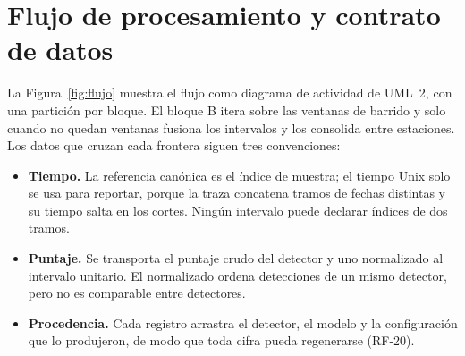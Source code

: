 \documentclass[12pt,oneside,spanish,oldfontcommands]{memoir}
\begin{document}
\section{Flujo de procesamiento y contrato de datos}
\label{sec:contrato-datos}

La Figura~\ref{fig:flujo} muestra el flujo como diagrama de actividad de
UML~2, con una partición por bloque. El bloque B itera sobre las ventanas de
barrido y solo cuando no quedan ventanas fusiona los intervalos y los
consolida entre estaciones. Los datos que cruzan cada frontera siguen tres
convenciones:

\begin{itemize}
\item \textbf{Tiempo.} La referencia canónica es el índice de muestra; el
tiempo Unix solo se usa para reportar, porque la traza concatena tramos de
fechas distintas y su tiempo salta en los cortes. Ningún intervalo puede
declarar índices de dos tramos.
\item \textbf{Puntaje.} Se transporta el puntaje crudo del detector y uno
normalizado al intervalo unitario. El normalizado ordena detecciones de un
mismo detector, pero no es comparable entre detectores.
\item \textbf{Procedencia.} Cada registro arrastra el detector, el modelo y la
configuración que lo produjeron, de modo que toda cifra pueda regenerarse
(RF-20).
\end{itemize}
\end{document}
